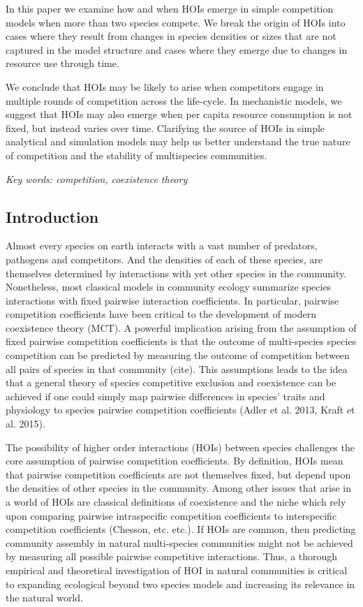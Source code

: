 \documentclass[12pt,]{article}
\begin{document}
In this paper we examine how and when HOIs emerge in simple competition
models when more than two species compete. We break the origin of HOIs
into cases where they result from changes in species densities or sizes
that are not captured in the model structure and cases where they emerge
due to changes in resource use through time.

We conclude that HOIs may be likely to arise when competitors engage in
multiple rounds of competition across the life-cycle. In mechanistic
models, we suggest that HOIs may also emerge when per capita resource
consumption is not fixed, but instead varies over time. Clarifying the
source of HOIs in simple analytical and simulation models may help us
better understand the true nature of competition and the stability of
multispecies communities.

\emph{Key words: competition, coexistence theory}

\subsection{Introduction}\label{introduction}

Almost every species on earth interacts with a vast number of predators,
pathogens and competitors. And the densities of each of these species,
are themselves determined by interactions with yet other species in the
community. Nonetheless, most classical models in community ecology
summarize species interactions with fixed pairwise interaction
coefficients. In particular, pairwise competition coefficients have been
critical to the development of modern coexistence theory (MCT). A
powerful implication arising from the assumption of fixed pairwise
competition coefficients is that the outcome of multi-species species
competition can be predicted by measuring the outcome of competition
between all pairs of species in that community (cite). This assumptions
leads to the idea that a general theory of species competitive exclusion
and coexistence can be achieved if one could simply map pairwise
differences in species' traits and physiology to species pairwise
competition coefficients (Adler et al. 2013, Kraft et al. 2015).

The possibility of higher order interactions (HOIs) between species
challenges the core assumption of pairwise competition coefficients. By
definition, HOIs mean that pairwise competition coefficients are not
themselves fixed, but depend upon the densities of other species in the
community. Among other issues that arise in a world of HOIs are
classical definitions of coexistence and the niche which rely upon
comparing pairwise intraspecific competition coefficients to
interspecific competition coefficients (Chesson, etc. etc.). If HOIs are
common, then predicting community assembly in natural multi-species
communities might not be achieved by measuring all possible pairwise
competitive interactions. Thus, a thorough empirical and theoretical
investigation of HOI in natural communities is critical to expanding
ecological beyond two species models and increasing its relevance in the
natural world.
\end{document}
